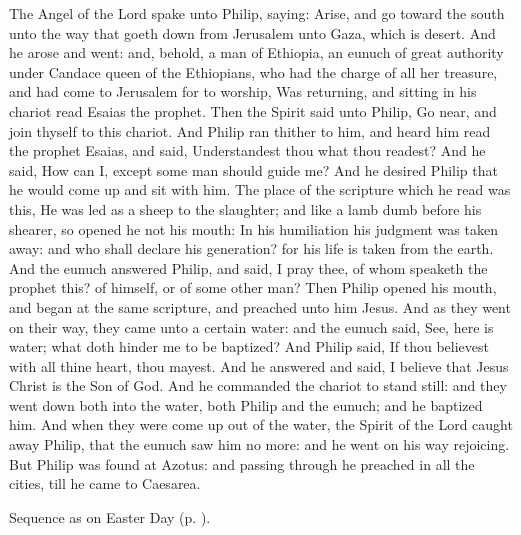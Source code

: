  The Angel of the Lord spake unto Philip, saying: Arise, and go toward the south unto the way that goeth down from Jerusalem unto Gaza, which is desert. And he arose and went: and, behold, a man of Ethiopia, an eunuch of great authority under Candace queen of the Ethiopians, who had the charge of all her treasure, and had come to Jerusalem for to worship, Was returning, and sitting in his chariot read Esaias the prophet. Then the Spirit said unto Philip, Go near, and join thyself to this chariot. And Philip ran thither to him, and heard him read the prophet Esaias, and said, Understandest thou what thou readest? And he said, How can I, except some man should guide me? And he desired Philip that he would come up and sit with him. The place of the scripture which he read was this, He was led as a sheep to the slaughter; and like a lamb dumb before his shearer, so opened he not his mouth: In his humiliation his judgment was taken away: and who shall declare his generation? for his life is taken from the earth. And the eunuch answered Philip, and said, I pray thee, of whom speaketh the prophet this? of himself, or of some other man? Then Philip opened his mouth, and began at the same scripture, and preached unto him Jesus. And as they went on their way, they came unto a certain water: and the eunuch said, See, here is water; what doth hinder me to be baptized? And Philip said, If thou believest with all thine heart, thou mayest. And he answered and said, I believe that Jesus Christ is the Son of God. And he commanded the chariot to stand still: and they went down both into the water, both Philip and the eunuch; and he baptized him. And when they were come up out of the water, the Spirit of the Lord caught away Philip, that the eunuch saw him no more: and he went on his way rejoicing. But Philip was found at Azotus: and passing through he preached in all the cities, till he came to Caesarea.


\begin{rubric}
    Sequence as on Easter Day (p. \pageref{PaschalSequence}).
\end{rubric}

